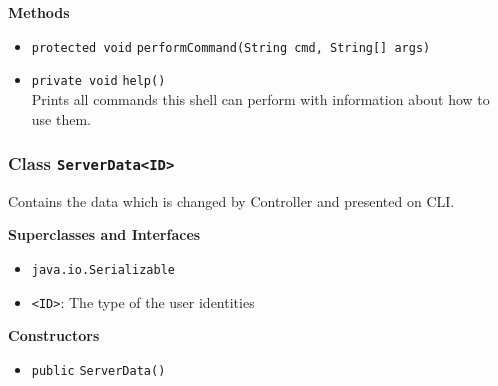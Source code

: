 \textbf{Methods}
\begin{itemize}
\item \lstinline|protected void| \lstinline|performCommand|\lstinline|(String cmd, String[] args)|




\item \lstinline|private void| \lstinline|help|\lstinline|()|\\
Prints all commands this shell can perform with information about how to use them.



\end{itemize}

\subsubsection{Class \lstinline|ServerData<ID>|}
Contains the data which is changed by Controller and presented on CLI. \\



\textbf{Superclasses and Interfaces}
\begin{itemize}
\item \lstinline|java.io.Serializable|
\end{itemize}

\begin{itemize}
\item \lstinline|<ID>|: The type of the user identities
\end{itemize}


\textbf{Constructors}
\begin{itemize}
\item \lstinline|public| \lstinline|ServerData|\lstinline|()|




\end{itemize}


